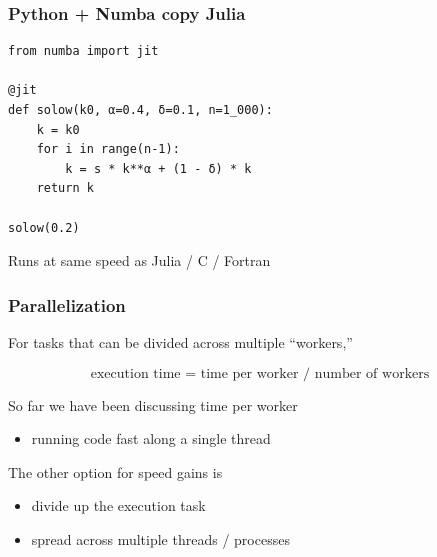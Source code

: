 \documentclass[
    xcolor={svgnames,dvipsnames},
    hyperref={colorlinks, citecolor=DeepPink4, linkcolor=DarkRed, urlcolor=DarkBlue}
    ]{beamer}  %
\newcommand{\1}{\mathbbm 1}
\begin{document}
\begin{frame}[fragile]
    \frametitle{Python + Numba copy Julia}
    
    \begin{verbatim}
from numba import jit

@jit
def solow(k0, α=0.4, δ=0.1, n=1_000):
    k = k0
    for i in range(n-1):
        k = s * k**α + (1 - δ) * k
    return k

solow(0.2)
    \end{verbatim}


    Runs at same speed as Julia / C / Fortran

\end{frame}


\begin{frame}
    \frametitle{Parallelization} 

    For tasks that can be divided across multiple ``workers,''

    \begin{equation*}
        \text{execution time = time per worker / number of workers}
    \end{equation*}

    \vspace{0.5em}
    So far we have been discussing time per worker 

    \begin{itemize}
        \item running code fast along a single thread
    \end{itemize}

    \vspace{0.5em}
    The other option for speed gains is

    \begin{itemize}
        \item divide up the execution task
    \vspace{0.5em}
        \item spread across multiple threads / processes
    \end{itemize}

\end{frame}
\end{document}
